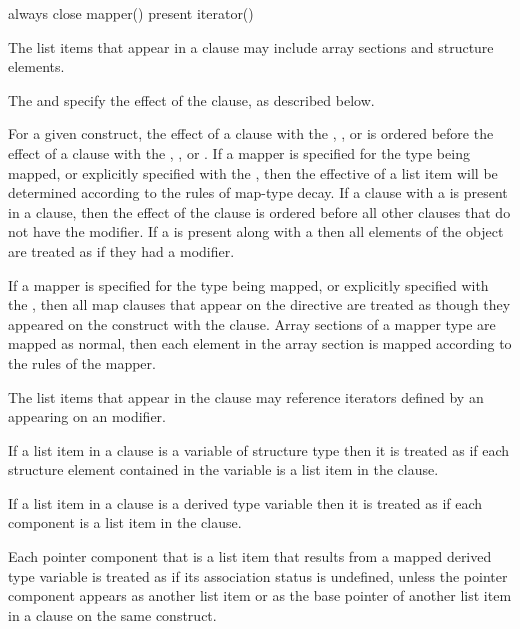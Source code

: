 \begin{indentedcodelist}
always
close
mapper()
present
iterator() 
\end{indentedcodelist}

\descr
The list items that appear in a  clause may include array sections 
and structure elements.

The  and  specify the effect of the 
 clause, as described below.

For a given construct, the effect of a  clause with the ,
, or   is ordered before the effect of a
 clause with the , , or 
. If a mapper is specified for the type being mapped, or
explicitly specified with the  , then the
effective  of a list item will be determined according to the
rules of map-type decay.  If a  clause with a 
 is present in a  clause, then
the effect of the clause is ordered before all other  clauses that do not have
the  modifier.  If a  
is present along with a   then all
elements of the object are treated as if they had a  modifier.

If a mapper is specified for the type being mapped, or explicitly specified with
the  , then all map clauses that appear on the
 directive are treated as though they appeared on the
construct with the  clause.  Array sections of a mapper type are
mapped as normal, then each element in the array section is mapped according to
the rules of the mapper.

The list items that appear in the  clause may reference iterators
defined by an  appearing on an  modifier.

\begin{ccppspecific}
If a list item in a  clause is a variable of structure type then it
is treated as if each structure element contained in the variable is a list
item in the clause.
\end{ccppspecific}

\begin{fortranspecific}
If a list item in a  clause is a derived type variable then
it is treated as if each component is a list item in the clause.

Each pointer component that is a list item that results from a mapped
derived type variable is treated as if its association status is
undefined, unless the pointer component appears as another list item
or as the base pointer of another list item in a  clause on
the same construct.
\end{fortranspecific}

